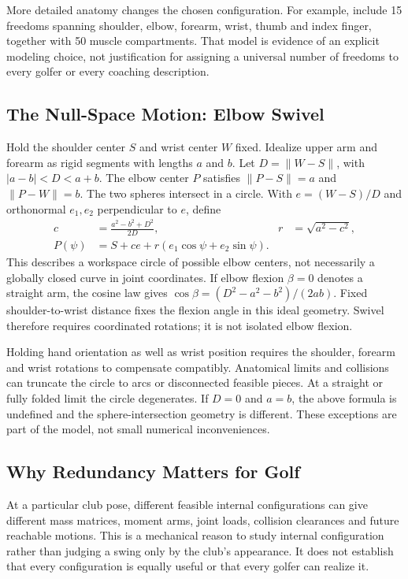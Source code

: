 More detailed anatomy changes the chosen configuration. For example, \citet{Holzbaur2005} include 15 freedoms spanning shoulder, elbow, forearm, wrist, thumb and index finger, together with 50 muscle compartments. That model is evidence of an explicit modeling choice, not justification for assigning a universal number of freedoms to every golfer or every coaching description.

\subsection{The Null-Space Motion: Elbow Swivel}
\label{ex:elbow_swivel}

Hold the shoulder center $S$ and wrist center $W$ fixed. Idealize upper arm and forearm as rigid segments with lengths $a$ and $b$. Let $D=\|W-S\|$, with $|a-b|<D<a+b$. The elbow center $P$ satisfies $\|P-S\|=a$ and $\|P-W\|=b$. The two spheres intersect in a circle. With $e=(W-S)/D$ and orthonormal $e_1,e_2$ perpendicular to $e$, define
\begin{equation}
\begin{aligned}
c&=\frac{a^2-b^2+D^2}{2D},& r&=\sqrt{a^2-c^2},\\
P(\psi)&=S+ce+r(e_1\cos\psi+e_2\sin\psi).
\end{aligned}
\end{equation}
This describes a workspace circle of possible elbow centers, not necessarily a globally closed curve in joint coordinates. If elbow flexion $\beta=0$ denotes a straight arm, the cosine law gives $\cos\beta=(D^2-a^2-b^2)/(2ab)$. Fixed shoulder-to-wrist distance fixes the flexion angle in this ideal geometry. Swivel therefore requires coordinated rotations; it is not isolated elbow flexion.

Holding hand orientation as well as wrist position requires the shoulder, forearm and wrist rotations to compensate compatibly. Anatomical limits and collisions can truncate the circle to arcs or disconnected feasible pieces. At a straight or fully folded limit the circle degenerates. If $D=0$ and $a=b$, the above formula is undefined and the sphere-intersection geometry is different. These exceptions are part of the model, not small numerical inconveniences.

\subsection{Why Redundancy Matters for Golf}

At a particular club pose, different feasible internal configurations can give different mass matrices, moment arms, joint loads, collision clearances and future reachable motions. This is a mechanical reason to study internal configuration rather than judging a swing only by the club's appearance. It does not establish that every configuration is equally useful or that every golfer can realize it.

